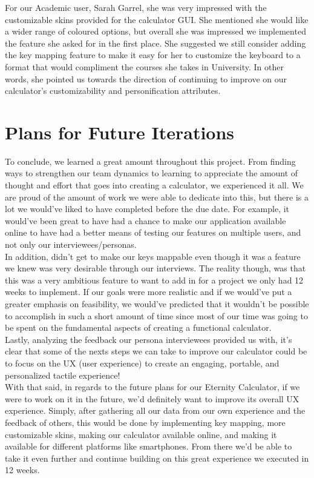 \documentclass[a4paper, 12pt]{article}
\begin{document}
For our Academic user, Sarah Garrel, she was very impressed with the customizable skins provided for the calculator GUI. She mentioned she would like a wider range of coloured options, but overall she was impressed we implemented the feature she asked for in the first place. She suggested we still consider adding the key mapping feature to make it easy for her to customize the keyboard to a format that would compliment the courses she takes in University. In other words, she pointed us towards the direction of continuing to improve  on our calculator’s customizability and personification attributes. 


\section{Plans for Future Iterations}

To conclude, we learned a great amount throughout this project. From finding ways to strengthen our team dynamics to learning to appreciate the amount of thought and effort that goes into creating a calculator, we experienced it all. We are proud of the amount of work we were able to dedicate into this, but there is a lot we would’ve liked to have completed before the due date. For example, it would’ve been great to have had a chance to make our application available online to have had a better means of testing our features on multiple users, and not only our interviewees/personas.
\\

In addition, didn’t get to make our keys mappable even though it was a feature we knew was very desirable through our interviews. The reality though, was that this was a very ambitious feature to want to add in for a project we only had 12 weeks to implement. If our goals were more realistic and if we would’ve put a greater emphasis on feasibility, we would’ve predicted that it wouldn’t be possible to accomplish in such a short amount of time since most of our time was going to be spent on the fundamental aspects of creating a functional calculator. 
\\

Lastly, analyzing the feedback our persona interviewees provided us with, it’s clear that some of the nexts steps we can take to improve our calculator could be to focus on the UX (user experience) to create an engaging, portable, and personalized tactile experience! 
\\

With that said, in regards to the future plans for our Eternity Calculator, if we were to work on it in the future, we’d definitely want to improve its overall UX experience. Simply, after gathering all our data from our own experience and the feedback of others, this would be done by implementing key mapping, more customizable skins, making our calculator available online, and making it available for different platforms like smartphones. From there we’d be able to take it even further and continue building on this great experience we executed in 12 weeks.
\end{document}
